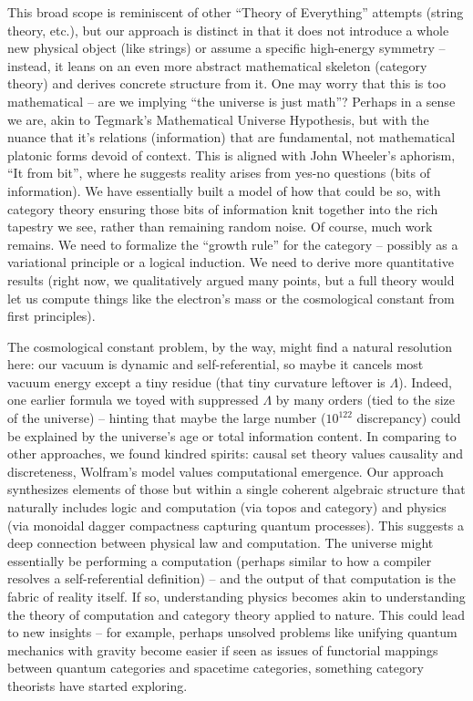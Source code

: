 \documentclass{article}
\begin{document}
This broad scope is reminiscent of other “Theory of Everything” attempts (string theory, etc.), but our approach is distinct in that it does not introduce a whole new physical object (like strings) or assume a specific high-energy symmetry – instead, it leans on an even more abstract mathematical skeleton (category theory) and derives concrete structure from it. One may worry that this is too mathematical – are we implying “the universe is just math”? Perhaps in a sense we are, akin to Tegmark’s Mathematical Universe Hypothesis, but with the nuance that it’s relations (information) that are fundamental, not mathematical platonic forms devoid of context. This is aligned with John Wheeler’s aphorism, “It from bit”, where he suggests reality arises from yes-no questions (bits of information)\cite{wheeler1989}. We have essentially built a model of how that could be so, with category theory ensuring those bits of information knit together into the rich tapestry we see, rather than remaining random noise. Of course, much work remains. We need to formalize the “growth rule” for the category – possibly as a variational principle or a logical induction. We need to derive more quantitative results (right now, we qualitatively argued many points, but a full theory would let us compute things like the electron’s mass or the cosmological constant from first principles).

The cosmological constant problem, by the way, might find a natural resolution here: our vacuum is dynamic and self-referential, so maybe it cancels most vacuum energy except a tiny residue (that tiny curvature leftover is $\Lambda$). Indeed, one earlier formula we toyed with suppressed $\Lambda$ by many orders (tied to the size of the universe)\cite{carlip2017} – hinting that maybe the large number ($10^{122}$ discrepancy) could be explained by the universe’s age or total information content. In comparing to other approaches, we found kindred spirits: causal set theory values causality and discreteness\cite{bombelli1987}, Wolfram’s model values computational emergence\cite{wolfram2020}. Our approach synthesizes elements of those but within a single coherent algebraic structure that naturally includes logic and computation (via topos and category) and physics (via monoidal dagger compactness capturing quantum processes\cite{abramsky2009}). This suggests a deep connection between physical law and computation. The universe might essentially be performing a computation (perhaps similar to how a compiler resolves a self-referential definition) – and the output of that computation is the fabric of reality itself. If so, understanding physics becomes akin to understanding the theory of computation and category theory applied to nature. This could lead to new insights – for example, perhaps unsolved problems like unifying quantum mechanics with gravity become easier if seen as issues of functorial mappings between quantum categories and spacetime categories, something category theorists have started exploring. 
\end{document}
